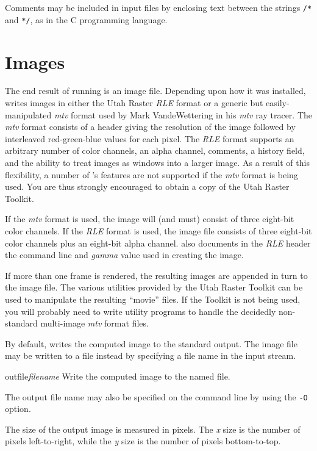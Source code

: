 Comments may be included in {\rayshade} input files by enclosing
text between the strings \verb!/*! and \verb!*/!, as in the C
programming
language.

\section{Images}

The end result of running {\rayshade} is an image file.  Depending upon
how it was installed, {\rayshade} writes images in either the Utah Raster
{\em RLE} format or a generic but easily-manipulated {\em mtv} format
used by Mark VandeWettering in his {\em mtv} ray tracer.  The {\em mtv}
format consists of a header giving the resolution of the image followed
by interleaved red-green-blue values for each pixel.  The {\em RLE} format
supports an arbitrary number of color channels,
an alpha channel, comments, a history field, and the ability
to treat images as windows into a larger image.  As a result of this
flexibility, a number of {\rayshade}'s features
are not
supported if the {\em mtv} format is being used. You are thus strongly
encouraged to obtain a copy of the Utah Raster Toolkit.

If the {\em mtv}
format is used, the image will (and must) consist of three eight-bit
color channels.
If the {\em RLE} format is used, the image file consists of three
eight-bit color channels plus an eight-bit alpha channel.  {\Rayshade}
also documents in the {\em RLE} header the command line and {\em gamma}
value used in creating the image.

If more than one frame is rendered, the resulting images are appended
in turn
to the image file.  The various utilities provided by the
Utah Raster Toolkit can be used to manipulate the resulting ``movie''
files.
If the Toolkit is not being used, you will probably need to write
utility programs to handle the decidedly non-standard multi-image {\em mtv}
format files.

By default, {\rayshade} writes the computed image to the standard output.
The image file may be written to a file instead by specifying a file name
in the input stream.

\begin{defkey}{outfile}{{\em filename}}
	Write the computed image to the named file.
\end{defkey}
The output file name may also be specified on the command line by
using the {\tt -O} option.

The size of the output image is measured in pixels.  The {\em x} size
is the number of pixels left-to-right, while the {\em y} size is
the number of pixels bottom-to-top.

